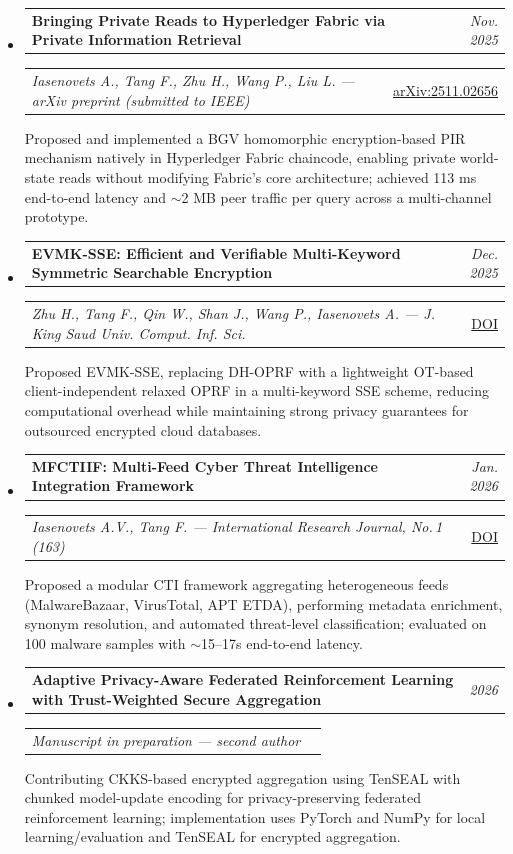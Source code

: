 \documentclass[11pt,letterpaper]{article}
\makeatletter
\newcommand{\headerrow}[2]
{\begin{tabular*}{\linewidth}{l@{\extracolsep{\fill}}r}
#1 & #2 \\
\end{tabular*}}
\makeatother
\begin{document}
\begin{itemize}[leftmargin=0em, itemsep=0.5em]
    \parskip=0.1em
    \renewcommand\labelitemi{}

    \item
    \headerrow
        {\textbf{Bringing Private Reads to Hyperledger Fabric via Private Information Retrieval}}
        {\emph{Nov. 2025}}
    \headerrow
        {\emph{Iasenovets A., Tang F., Zhu H., Wang P., Liu L. --- arXiv preprint (submitted to IEEE)}}
        {\href{https://arxiv.org/abs/2511.02656}{arXiv:2511.02656}}
    \vspace{0.1em}
    {\small Proposed and implemented a BGV homomorphic encryption-based PIR mechanism natively in Hyperledger Fabric chaincode, enabling private world-state reads without modifying Fabric's core architecture; achieved 113 ms end-to-end latency and $\sim$2 MB peer traffic per query across a multi-channel prototype.}

    \item
    \headerrow
        {\textbf{EVMK-SSE: Efficient and Verifiable Multi-Keyword Symmetric Searchable Encryption}}
        {\emph{Dec. 2025}}
    \headerrow
        {\emph{Zhu H., Tang F., Qin W., Shan J., Wang P., Iasenovets A. --- J. King Saud Univ. Comput. Inf. Sci.}}
        {\href{https://doi.org/10.1007/s44443-025-00405-8}{DOI}}
    \vspace{0.1em}
    {\small Proposed EVMK-SSE, replacing DH-OPRF with a lightweight OT-based client-independent relaxed OPRF in a multi-keyword SSE scheme, reducing computational overhead while maintaining strong privacy guarantees for outsourced encrypted cloud databases.}

    \item
    \headerrow
        {\textbf{MFCTIIF: Multi-Feed Cyber Threat Intelligence Integration Framework}}
        {\emph{Jan. 2026}}
    \headerrow
        {\emph{Iasenovets A.V., Tang F. --- International Research Journal, No.\,1 (163)}}
        {\href{https://doi.org/10.60797/IRJ.2026.163.57}{DOI}}
    \vspace{0.1em}
    {\small Proposed a modular CTI framework aggregating heterogeneous feeds (MalwareBazaar, VirusTotal, APT ETDA), performing metadata enrichment, synonym resolution, and automated threat-level classification; evaluated on 100 malware samples with $\sim$15--17s end-to-end latency.}

    \item
    \headerrow
        {\textbf{Adaptive Privacy-Aware Federated Reinforcement Learning with Trust-Weighted Secure Aggregation}}
        {\emph{2026}}
    \headerrow
        {\emph{Manuscript in preparation --- second author}}
        {}
    \vspace{0.1em}
    {\small Contributing CKKS-based encrypted aggregation using TenSEAL with chunked model-update encoding for privacy-preserving federated reinforcement learning; implementation uses PyTorch and NumPy for local learning/evaluation and TenSEAL for encrypted aggregation.}

\end{itemize}
\end{document}
